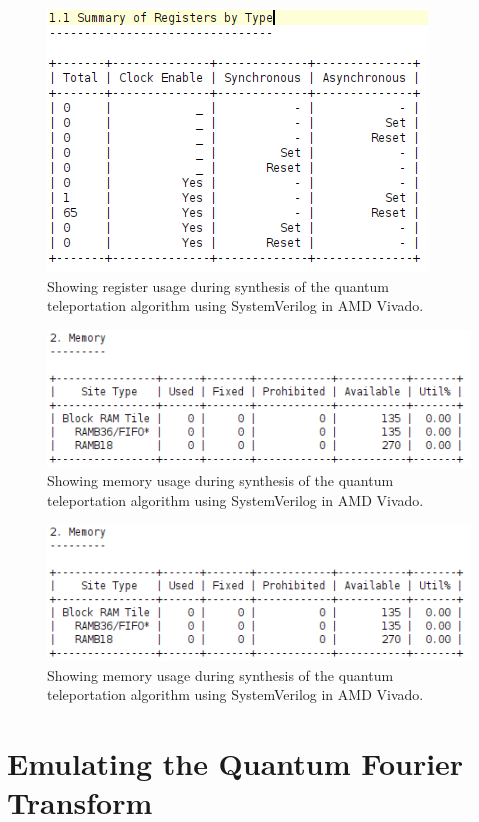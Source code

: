 \begin{figure}[!ht]
	\centering
	\includegraphics[width=0.45\linewidth]{body/ch6/figs/qta-registers}
	\caption[Showing Results from Synthesis of the Quantum Teleportation Algorithm]{Showing register usage during synthesis of the quantum teleportation algorithm using SystemVerilog in AMD Vivado.}
\label{fig:qta-3}
\end{figure}

\begin{figure}[!ht]
	\centering
	\includegraphics[width=0.45\linewidth]{body/ch6/figs/qta-memory}
	\caption[Showing Results from Synthesis of the Quantum Teleportation Algorithm]{Showing memory usage during synthesis of the quantum teleportation algorithm using SystemVerilog in AMD Vivado.}
\label{fig:qta-4}
\end{figure}

\begin{figure}[!ht]
	\centering
	\includegraphics[width=0.45\linewidth]{body/ch6/figs/qta-memory}
	\caption[Showing Results from Synthesis of the Quantum Teleportation Algorithm]{Showing memory usage during synthesis of the quantum teleportation algorithm using SystemVerilog in AMD Vivado.}
\label{fig:qta-5}
\end{figure}

\section{Emulating the Quantum Fourier Transform}

